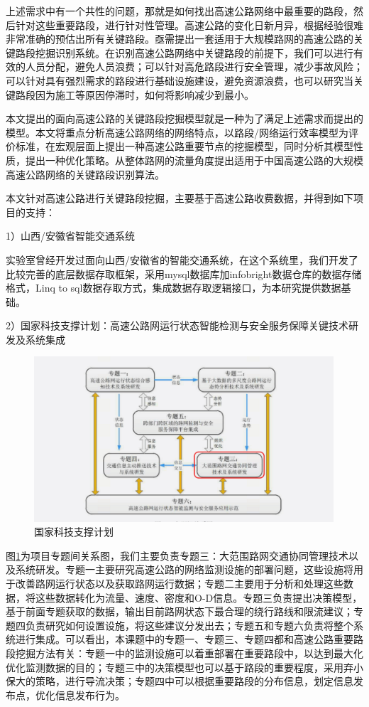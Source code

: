 上述需求中有一个共性的问题，那就是如何找出高速公路网络中最重要的路段，然后针对这些重要路段，进行针对性管理。高速公路的变化日新月异，根据经验很难非常准确的预估出所有关键路段。亟需提出一套适用于大规模路网的高速公路的关键路段挖掘识别系统。在识别高速公路网络中关键路段的前提下，我们可以进行有效的人员分配，避免人员浪费；可以针对高危路段进行安全管理，减少事故风险；可以针对具有强烈需求的路段进行基础设施建设，避免资源浪费，也可以研究当关键路段因为施工等原因停滞时，如何将影响减少到最小。

本文提出的面向高速公路的关键路段挖掘模型就是一种为了满足上述需求而提出的模型。本文将重点分析高速公路网络的网络特点，以路段/网络运行效率模型为评价标准，在宏观层面上提出一种高速公路重要节点的挖掘模型，同时分析其模型性质，提出一种优化策略。从整体路网的流量角度提出适用于中国高速公路的大规模高速公路网络的关键路段识别算法。

本文针对高速公路进行关键路段挖掘，主要基于高速公路收费数据，并得到如下项目的支持：

1）山西/安徽省智能交通系统

	实验室曾经开发过面向山西/安徽省的智能交通系统，在这个系统里，我们开发了比较完善的底层数据存取框架，采用mysql数据库加infobright数据仓库的数据存储格式，Linq to sql数据存取方式，集成数据存取逻辑接口，为本研究提供数据基础。

2）国家科技支撑计划：高速公路网运行状态智能检测与安全服务保障关键技术研发及系统集成
	

				\begin{figure}[h]
				\centering
						\begin{minipage}{0.8\linewidth}
							\centering
							\includegraphics[width=4.4in]{picture/zhichengjihua}
							\caption{国家科技支撑计划}
							\label{zhichengjihua}
						\end{minipage}%
				\end{figure}
图\ref{zhichengjihua}为项目专题间关系图，我们主要负责专题三：大范围路网交通协同管理技术以及系统研发。专题一主要研究高速公路的网络监测设施的部署问题，这些设施将用于改善路网运行状态以及获取路网运行数据；专题二主要用于分析和处理这些数据，将这些数据转化为流量、速度、密度和O-D信息。专题三负责提出决策模型，基于前面专题获取的数据，输出目前路网状态下最合理的绕行路线和限流建议；专题四负责研究如何设置设施，将这些建议分发出去；专题五和专题六负责将整个系统进行集成。可以看出，本课题中的专题一、专题三、专题四都和高速公路重要路段挖掘方法有关：专题一中的监测设施可以着重部署在重要路段中，以达到最大化优化监测数据的目的；专题三中的决策模型也可以基于路段的重要程度，采用弃小保大的策略，进行导流决策；专题四中可以根据重要路段的分布信息，划定信息发布点，优化信息发布行为。





